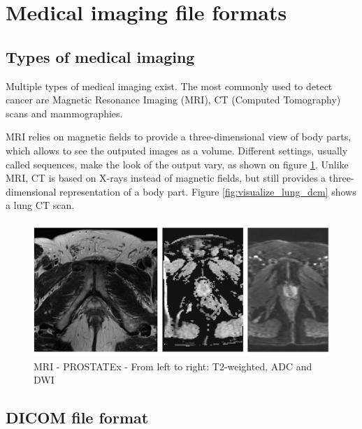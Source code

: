 
\section{Medical imaging file formats}
\subsection{Types of medical imaging}
\label{sec:medical_imaging}

Multiple types of medical imaging exist. The most commonly used to detect cancer are Magnetic Resonance Imaging (MRI), CT (Computed Tomography) scans
and mammographies. 

MRI relies on magnetic fields to provide a three-dimensional view of body parts, which allows to see the outputed images as a volume. Different settings, usually called sequences, make the look of the output vary, as shown on figure \ref{fig:PROSTATEx-t2-adc-dwi}.
Unlike MRI, CT is based on X-rays instead of magnetic fields, but still provides a three-dimensional representation of a body part. Figure \ref{fig:visualize_lung_dcm} shows a lung CT scan.

\begin{figure}[!h]
\centering
\includegraphics[width=1\textwidth, keepaspectratio=true]{./figures/PROSTATEx-t2-adc-dwi.png}
\caption{MRI - PROSTATEx - From left to right: T2-weighted, ADC and DWI}
\label{fig:PROSTATEx-t2-adc-dwi}
\end{figure}

\subsection{DICOM file format}

